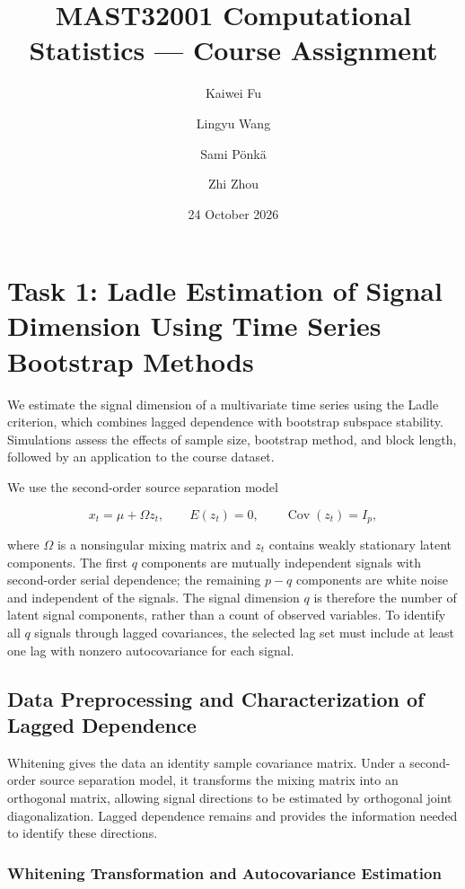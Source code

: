 \documentclass[
  english,
  11pt,
  a4paper,
]{article}
\title{MAST32001 Computational Statistics --- Course Assignment}
\author{Kaiwei Fu \and Lingyu Wang \and Sami Pönkä \and Zhi Zhou}
\date{24 October 2026}
\begin{document}
\maketitle


\section{Task 1: Ladle Estimation of Signal Dimension Using Time Series
Bootstrap
Methods}\label{task-1-ladle-estimation-of-signal-dimension-using-time-series-bootstrap-methods}

We estimate the signal dimension of a multivariate time series using the
Ladle criterion, which combines lagged dependence with bootstrap
subspace stability. Simulations assess the effects of sample size,
bootstrap method, and block length, followed by an application to the
course dataset.

We use the second-order source separation model

\[
x_t=\mu+\Omega z_t,\qquad E(z_t)=0,\qquad \operatorname{Cov}(z_t)=I_p,
\]

where \(\Omega\) is a nonsingular mixing matrix and \(z_t\) contains
weakly stationary latent components. The first \(q\) components are
mutually independent signals with second-order serial dependence; the
remaining \(p-q\) components are white noise and independent of the
signals. The signal dimension \(q\) is therefore the number of latent
signal components, rather than a count of observed variables. To
identify all \(q\) signals through lagged covariances, the selected lag
set must include at least one lag with nonzero autocovariance for each
signal.

\subsection{Data Preprocessing and Characterization of Lagged
Dependence}\label{data-preprocessing-and-characterization-of-lagged-dependence}

Whitening gives the data an identity sample covariance matrix. Under a
second-order source separation model, it transforms the mixing matrix
into an orthogonal matrix, allowing signal directions to be estimated by
orthogonal joint diagonalization. Lagged dependence remains and provides
the information needed to identify these directions.

\subsubsection{Whitening Transformation and Autocovariance
Estimation}\label{whitening-transformation-and-autocovariance-estimation}
\end{document}

